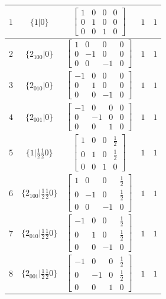 \documentclass[fleqn,8pt]{jsarticle}
\begin{document}
\begin{longtable}{ccccc}
$ 1 $ & $ \{1|0\} $ & $ \begin{bmatrix} 1 & 0 & 0 & 0 \\ 0 & 1 & 0 & 0 \\ 0 & 0 & 1 & 0 \end{bmatrix} $ & $ 1 $ & $ 1 $ \\ \hline
$ 2 $ & $ \{2{}_{100}|0\} $ & $ \begin{bmatrix} 1 & 0 & 0 & 0 \\ 0 & -1 & 0 & 0 \\ 0 & 0 & -1 & 0 \end{bmatrix} $ & $ 1 $ & $ 1 $ \\ \hline
$ 3 $ & $ \{2{}_{010}|0\} $ & $ \begin{bmatrix} -1 & 0 & 0 & 0 \\ 0 & 1 & 0 & 0 \\ 0 & 0 & -1 & 0 \end{bmatrix} $ & $ 1 $ & $ 1 $ \\ \hline
$ 4 $ & $ \{2{}_{001}|0\} $ & $ \begin{bmatrix} -1 & 0 & 0 & 0 \\ 0 & -1 & 0 & 0 \\ 0 & 0 & 1 & 0 \end{bmatrix} $ & $ 1 $ & $ 1 $ \\ \hline
$ 5 $ & $ \{1|\frac{1}{2} \frac{1}{2} 0\} $ & $ \begin{bmatrix} 1 & 0 & 0 & \frac{1}{2} \\ 0 & 1 & 0 & \frac{1}{2} \\ 0 & 0 & 1 & 0 \end{bmatrix} $ & $ 1 $ & $ 1 $ \\ \hline
$ 6 $ & $ \{2{}_{100}|\frac{1}{2} \frac{1}{2} 0\} $ & $ \begin{bmatrix} 1 & 0 & 0 & \frac{1}{2} \\ 0 & -1 & 0 & \frac{1}{2} \\ 0 & 0 & -1 & 0 \end{bmatrix} $ & $ 1 $ & $ 1 $ \\ \hline
$ 7 $ & $ \{2{}_{010}|\frac{1}{2} \frac{1}{2} 0\} $ & $ \begin{bmatrix} -1 & 0 & 0 & \frac{1}{2} \\ 0 & 1 & 0 & \frac{1}{2} \\ 0 & 0 & -1 & 0 \end{bmatrix} $ & $ 1 $ & $ 1 $ \\ \hline
$ 8 $ & $ \{2{}_{001}|\frac{1}{2} \frac{1}{2} 0\} $ & $ \begin{bmatrix} -1 & 0 & 0 & \frac{1}{2} \\ 0 & -1 & 0 & \frac{1}{2} \\ 0 & 0 & 1 & 0 \end{bmatrix} $ & $ 1 $ & $ 1 $ \\ \hline

\end{longtable}
\end{document}

